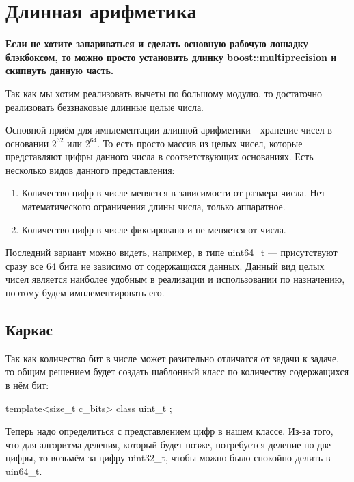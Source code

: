 
\section{Длинная арифметика}
\textbf{Если не хотите запариваться и сделать основную рабочую лошадку блэкбоксом, то можно просто установить длинку boost::multiprecision и скипнуть данную часть.}

Так как мы хотим реализовать вычеты по большому модулю, то достаточно реализовать беззнаковые длинные целые числа.

Основной приём для имплементации длинной арифметики - хранение чисел в основании $2^{32}$ или $2^{64}$. То есть просто массив из целых чисел, которые представляют цифры данного числа в соответствующих основаниях. Есть несколько видов данного представления:
\begin{enumerate}
  \item Количество цифр в числе меняется в зависимости от размера числа. Нет математического ограничения длины числа, только аппаратное.
  \item Количество цифр в числе фиксировано и не меняется от числа.
\end{enumerate}
Последний вариант можно видеть, например, в типе uint64\_t --- присутствуют сразу все 64 бита не зависимо от содержащихся данных. Данный вид целых чисел является наиболее удобным в реализации и использовании по назначению, поэтому будем имплементировать его.

\subsection{Каркас}
Так как количество бит в числе может разительно отличатся от задачи к задаче, то общим решением будет создать шаблонный класс по количеству содержащихся в нём бит:
\begin{cppcode}
template<size_t c_bits>
class uint_t {
};
\end{cppcode}
Теперь надо определиться с представлением цифр в нашем классе. Из-за того, что для алгоритма деления, который будет позже, потребуется деление по две цифры, то возьмём за цифру uint32\_t, чтобы можно было спокойно делить в uin64\_t.

